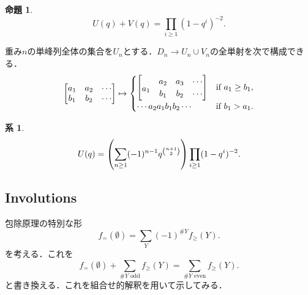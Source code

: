 \documentclass[xelatex,ja=standard,a4paper,14pt,everyparhook=compat]{bxjsarticle}
\newcommand{\up}[1]{\smash{\raisebox{.5\normalbaselineskip}{$#1$}}}
\theoremstyle{definition}
\newtheorem{proposition}[theorem]{命題}
\newtheorem{corollary}[theorem]{系}
\begin{document}
\begin{proposition}
    \begin{equation*}
        U(q) + V(q) = \prod_{i \geq 1} (1-q^i)^{-2}.
    \end{equation*}
\end{proposition}

重み$n$の単峰列全体の集合を$U_n$とする．$D_n \to U_n \cup V_n$の全単射を次で構成できる． \begin{equation*}
    \begin{bmatrix}
        a_1 & a_2 & \cdots \\
        b_1 & b_2 & \cdots
    \end{bmatrix} \mapsto \begin{cases}
        \begin{bmatrix}
                     & a_2 & a_3 & \cdots \\
            \up{a_1} & b_1 & b_2 & \cdots
        \end{bmatrix} & \text{if $a_1 \geq b_1$}, \\
        \cdots a_2 a_1 b_1 b_2 \cdots & \text{if $b_1 > a_1$}.
    \end{cases}
\end{equation*}

\begin{corollary}
    \begin{equation*}
        U(q) = \mleft( \sum_{n \geq 1} (-1)^{n-1} q^{\binom{n+1}{2}} \mright) \prod_{i \geq 1} (1-q^i)^{-2}.
    \end{equation*}
\end{corollary}

\newpage

\subsection{Involutions}

包除原理の特別な形 \begin{equation*}
    f_=(\emptyset) = \sum_Y (-1)^{\#Y} f_\geq(Y).
\end{equation*}
を考える．これを \begin{equation*}
    f_=(\emptyset) + \sum_{\#Y\text{ odd}} f_\geq(Y) = \sum_{\#Y\text{ even}} f_\geq(Y).
\end{equation*}
と書き換える．これを組合せ的解釈を用いて示してみる．
\end{document}
